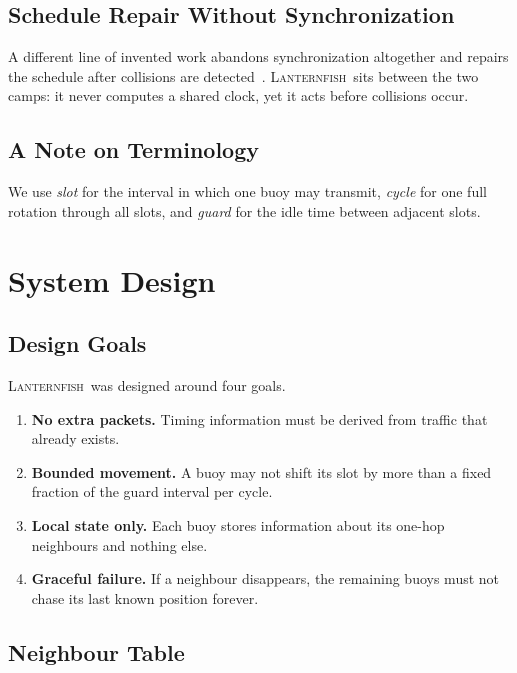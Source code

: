 \documentclass[conference]{IEEEtran}
\newcommand{\sysname}{\textsc{Lanternfish}}
\begin{document}
\subsection{Schedule Repair Without Synchronization}
\label{sec:bg-repair}

A different line of invented work abandons synchronization altogether and
repairs the schedule after collisions are detected~\cite{abara2031repair}.
\sysname\ sits between the two camps: it never computes a shared clock, yet it
acts before collisions occur.

\subsection*{A Note on Terminology}

We use \emph{slot} for the interval in which one buoy may transmit, \emph{cycle}
for one full rotation through all slots, and \emph{guard} for the idle time
between adjacent slots.

\section{System Design}
\label{sec:design}

\subsection{Design Goals}
\label{sec:design-goals}

\sysname\ was designed around four goals.
\begin{enumerate}
  \item \textbf{No extra packets.} Timing information must be derived from
        traffic that already exists.
  \item \textbf{Bounded movement.} A buoy may not shift its slot by more than a
        fixed fraction of the guard interval per cycle.
  \item \textbf{Local state only.} Each buoy stores information about its
        one-hop neighbours and nothing else.
  \item \textbf{Graceful failure.} If a neighbour disappears, the remaining
        buoys must not chase its last known position forever.
\end{enumerate}

\subsection{Neighbour Table}
\label{sec:design-table}
\end{document}
